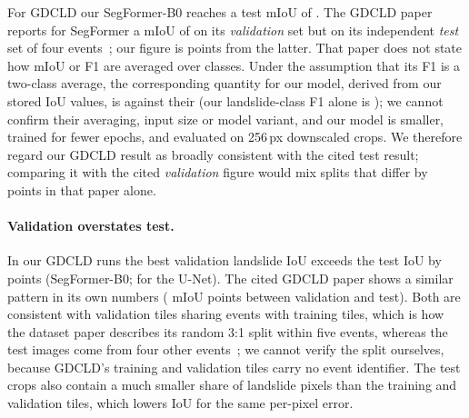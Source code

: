 \documentclass[11pt]{article}
\newcommand{\iou}{IoU}
\begin{document}
For GDCLD our SegFormer-B0 reaches a test mIoU of \InGdcRgbSegMiou{}. The GDCLD paper reports for SegFormer a mIoU of \LitEssdValSegformerMiou{} on its \emph{validation} set but \LitEssdTestSegformerMiou{} on its independent \emph{test} set of four events~\cite{fang2024gdcld}; our figure is \GdcOursMinusEssdTestMiou{} points from the latter. That paper does not state how mIoU or F1 are averaged over classes. Under the assumption that its F1 is a two-class average, the corresponding quantity for our model, derived from our stored \iou{} values, is \InGdcRgbSegMacroFone{} against their \LitEssdTestSegformerFOne{} (our landslide-class F1 alone is \InGdcRgbSegFone{}); we cannot confirm their averaging, input size or model variant, and our model is smaller, trained for fewer epochs, and evaluated on 256\,px downscaled crops. We therefore regard our GDCLD result as broadly consistent with the cited test result; comparing it with the cited \emph{validation} figure would mix splits that differ by \LitEssdValTestGap{} points in that paper alone.

\begin{table}[t]\centering\small
\resizebox{\textwidth}{!}{}
\caption{Values reported by other papers, shown as context only (E2). Read through a page-retrieval tool; table images were not inspected, so every value must be checked against the original. Inputs, splits, models and metric definitions differ from ours.}\label{tab:lit}
\end{table}

\paragraph{Validation overstates test.} In our GDCLD runs the best validation landslide \iou{} exceeds the test \iou{} by \GdcValTestSegGap{} points (SegFormer-B0; \GdcValTestUnetGap{} for the U-Net). The cited GDCLD paper shows a similar pattern in its own numbers (\LitEssdValTestGap{} mIoU points between validation and test). Both are consistent with validation tiles sharing events with training tiles, which is how the dataset paper describes its random 3:1 split within five events, whereas the test images come from four other events~\cite{fang2024gdcld}; we cannot verify the split ourselves, because GDCLD's training and validation tiles carry no event identifier. The test crops also contain a much smaller share of landslide pixels than the training and validation tiles, which lowers \iou{} for the same per-pixel error.
\end{document}
